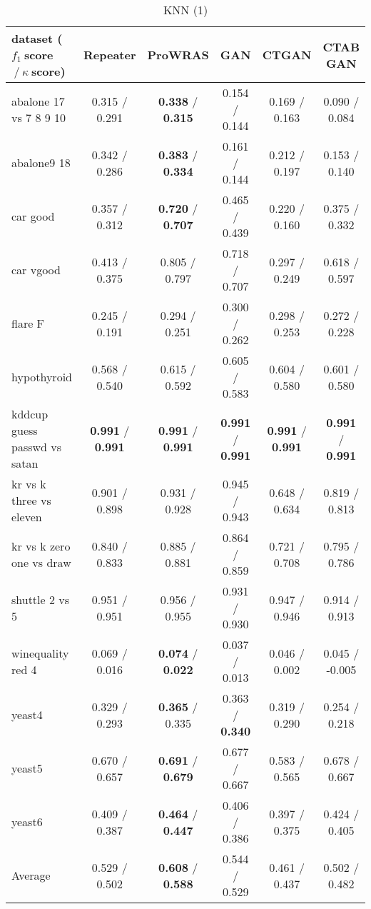 \begin{table*}[ht]\scriptsize\caption{KNN (1)}\label{tab:results:KNN:A}\centering\tabularnewline
\begin{tabular}{l|@{\hskip3pt}c@{\hskip3pt}|@{\hskip3pt}c@{\hskip3pt}|@{\hskip3pt}c@{\hskip3pt}|@{\hskip3pt}c@{\hskip3pt}|@{\hskip3pt}c@{\hskip3pt}}\hline
\textbf{dataset ($f_1~$score$~/~\kappa~$score)} & \textbf{Repeater} & \textbf{ProWRAS} & \textbf{GAN} & \textbf{CTGAN} & \textbf{CTAB GAN}
\tabularnewline
\hline
abalone 17 vs 7 8 9 10 &  0.315  /  0.291  &  \textbf{0.338}  /  \textbf{0.315}  &  0.154  /  0.144  &  0.169  /  0.163  &  0.090  /  0.084 
\tabularnewline
abalone9 18 &  0.342  /  0.286  &  \textbf{0.383}  /  \textbf{0.334}  &  0.161  /  0.144  &  0.212  /  0.197  &  0.153  /  0.140 
\tabularnewline
car good &  0.357  /  0.312  &  \textbf{0.720}  /  \textbf{0.707}  &  0.465  /  0.439  &  0.220  /  0.160  &  0.375  /  0.332 
\tabularnewline
car vgood &  0.413  /  0.375  &  0.805  /  0.797  &  0.718  /  0.707  &  0.297  /  0.249  &  0.618  /  0.597 
\tabularnewline
flare F &  0.245  /  0.191  &  0.294  /  0.251  &  0.300  /  0.262  &  0.298  /  0.253  &  0.272  /  0.228 
\tabularnewline
hypothyroid &  0.568  /  0.540  &  0.615  /  0.592  &  0.605  /  0.583  &  0.604  /  0.580  &  0.601  /  0.580 
\tabularnewline
kddcup guess passwd vs satan &  \textbf{0.991}  /  \textbf{0.991}  &  \textbf{0.991}  /  \textbf{0.991}  &  \textbf{0.991}  /  \textbf{0.991}  &  \textbf{0.991}  /  \textbf{0.991}  &  \textbf{0.991}  /  \textbf{0.991} 
\tabularnewline
kr vs k three vs eleven &  0.901  /  0.898  &  0.931  /  0.928  &  0.945  /  0.943  &  0.648  /  0.634  &  0.819  /  0.813 
\tabularnewline
kr vs k zero one vs draw &  0.840  /  0.833  &  0.885  /  0.881  &  0.864  /  0.859  &  0.721  /  0.708  &  0.795  /  0.786 
\tabularnewline
shuttle 2 vs 5 &  0.951  /  0.951  &  0.956  /  0.955  &  0.931  /  0.930  &  0.947  /  0.946  &  0.914  /  0.913 
\tabularnewline
winequality red 4 &  0.069  /  0.016  &  \textbf{0.074}  /  \textbf{0.022}  &  0.037  /  0.013  &  0.046  /  0.002  &  0.045  /  -0.005 
\tabularnewline
yeast4 &  0.329  /  0.293  &  \textbf{0.365}  /  0.335  &  0.363  /  \textbf{0.340}  &  0.319  /  0.290  &  0.254  /  0.218 
\tabularnewline
yeast5 &  0.670  /  0.657  &  \textbf{0.691}  /  \textbf{0.679}  &  0.677  /  0.667  &  0.583  /  0.565  &  0.678  /  0.667 
\tabularnewline
yeast6 &  0.409  /  0.387  &  \textbf{0.464}  /  \textbf{0.447}  &  0.406  /  0.386  &  0.397  /  0.375  &  0.424  /  0.405 
\tabularnewline
\hline Average &  0.529  /  0.502  &  \textbf{0.608}  /  \textbf{0.588}  &  0.544  /  0.529  &  0.461  /  0.437  &  0.502  /  0.482 
\tabularnewline
\hline\end{tabular}\end{table*}


